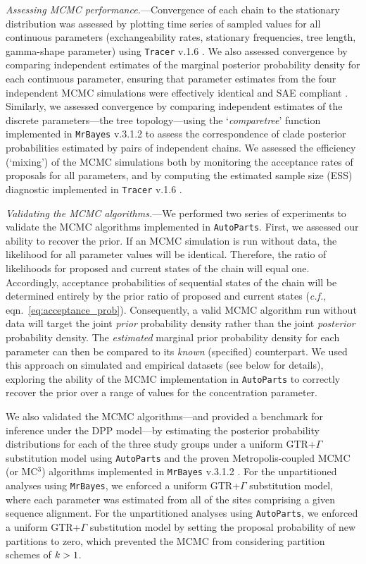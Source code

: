 \documentclass[11pt]{article}
\begin{document}
\bigskip
\noindent
{\it Assessing MCMC performance.}---Convergence of each chain to the stationary distribution was assessed by plotting time series of sampled values for all continuous parameters (exchangeability rates, stationary frequencies, tree length, gamma-shape parameter) using \verb!Tracer! v.1.6 \citep{rambaut07}.
We also assessed convergence by comparing independent estimates of the marginal posterior probability density for each continuous parameter, ensuring that parameter estimates from the four independent MCMC simulations were effectively identical and SAE compliant \citep[{\it c.f.},][]{Brooks_1997}.
Similarly, we assessed convergence by comparing independent estimates of the discrete parameters---the tree topology---using the `{\it comparetree}' function implemented in \verb!MrBayes! v.3.1.2 \citep{ronquist03} to assess the correspondence of clade posterior probabilities estimated by pairs of independent chains. 
We assessed the efficiency (`mixing') of the MCMC simulations both by monitoring the acceptance rates of proposals for all parameters, and by computing the estimated sample size (ESS) diagnostic implemented in \verb!Tracer! v.1.6 \citep{rambaut07}.

\bigskip
\noindent
{\it Validating the MCMC algorithms.}---We performed two series of experiments to validate the MCMC algorithms implemented in \verb!AutoParts!.
First, we assessed our ability to recover the prior.
If an MCMC simulation is run without data, the likelihood for all parameter values will be identical.
Therefore, the ratio of likelihoods for proposed and current states of the chain will equal one.
Accordingly, acceptance probabilities of sequential states of the chain will be determined entirely by the prior ratio of proposed and current states (\emph{c.f.}, eqn.~\ref{eq:acceptance_prob}).
Consequently, a valid MCMC algorithm run without data will target the joint \emph{prior} probability density rather than the joint \emph{posterior} probability density.
The \emph{estimated} marginal prior probability density for each parameter can then be compared to its \emph{known} (specified) counterpart.
We used this approach on simulated and empirical datasets (see below for details), exploring the ability of the MCMC implementation in \verb!AutoParts! to correctly recover the prior over a range of values for the concentration parameter.  

We also validated the MCMC algorithms---and provided a benchmark for inference under the DPP model---by estimating the posterior probability distributions for each of the three study groups under a uniform GTR+$\Gamma$ substitution model using \verb!AutoParts! and the proven Metropolis-coupled MCMC (or MC$^3$) algorithms implemented in \verb!MrBayes! v.3.1.2 \citep{ronquist03}. 
For the unpartitioned analyses using \verb!MrBayes!, we enforced a uniform GTR+$\Gamma$ substitution model, where each parameter was estimated from all of the sites comprising a given sequence alignment.
For the unpartitioned analyses using \verb!AutoParts!, we enforced a uniform GTR+$\Gamma$ substitution model by setting the proposal probability of new partitions to zero, which prevented the MCMC from considering partition schemes of ${\it k} >1$.  
\end{document}
